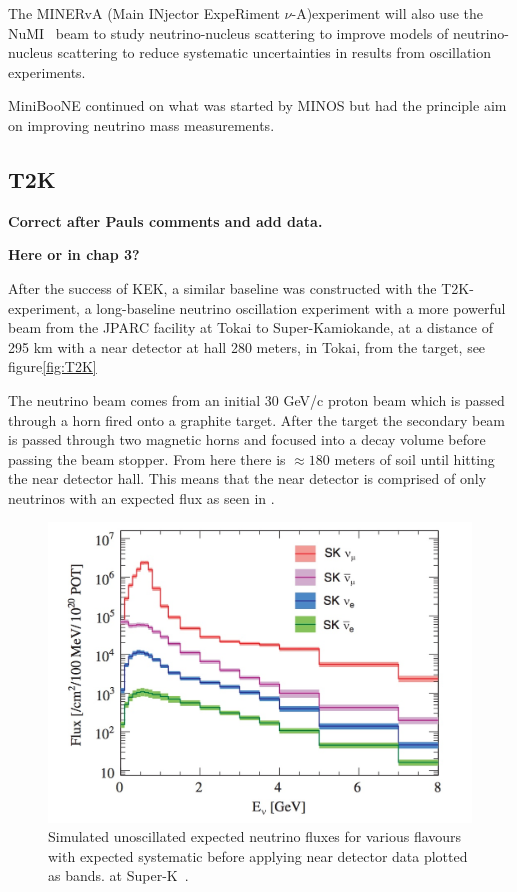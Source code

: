 The MINERvA (Main INjector ExpeRiment $\nu$-A)experiment \cite{39minerva} will also use the NuMI~\cite{19NuMI} beam to study neutrino-nucleus scattering to improve models of neutrino-nucleus scattering to reduce systematic uncertainties in results from oscillation experiments.

MiniBooNE\cite{41MiniBooNE} continued on what was started by MINOS but had the principle aim on improving neutrino mass measurements.

\subsection{T2K}
\textbf{Correct after Pauls comments and add data.}

\textbf{Here or in chap 3?}

After the success of KEK, a similar baseline was constructed with the T2K-experiment\cite{21T2K},  a long-baseline neutrino oscillation experiment with a more powerful beam from the JPARC facility at Tokai to Super-Kamiokande, at a distance of 295 km with a near detector at hall 280 meters, in Tokai, from the target, see figure\ref{fig:T2K}

The neutrino beam comes from an initial 30 GeV/c proton beam which is passed through a horn fired onto a graphite target. After the target the secondary beam is passed through two magnetic horns and focused into a decay volume before passing the beam stopper. From here there is $\approx180$ meters of soil until hitting the near detector hall. This means that the near detector is comprised of only neutrinos with an expected flux as seen in . 

\begin{figure}[h!]
\centering
  \centering
\includegraphics[width=\textwidth]{figures/ND280Flux.jpeg}
\vspace{2mm}
\caption{Simulated unoscillated expected neutrino fluxes for various flavours with expected systematic before applying near detector data plotted as bands. at Super-K~\cite{21T2K}.}
\label{fig:ND280Flux}
\end{figure}

